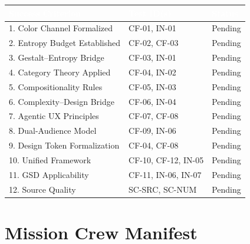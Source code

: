 \documentclass[11pt,letterpaper]{article}
\newcommand{\tableheader}[1]{\textbf{\sffamily\textcolor{white}{#1}}}
\begin{document}
\begin{center}
\begin{tabularx}{\textwidth}{XL{3.5cm}C{1.5cm}}
\toprule
{}
\tableheader{Success Criterion} & \tableheader{Test ID(s)} & \tableheader{Status} \\
. Color Channel Formalized & CF-01, IN-01 & Pending \\
2. Entropy Budget Established & CF-02, CF-03 & Pending \\
3. Gestalt--Entropy Bridge & CF-03, IN-01 & Pending \\
4. Category Theory Applied & CF-04, IN-02 & Pending \\
5. Compositionality Rules & CF-05, IN-03 & Pending \\
6. Complexity--Design Bridge & CF-06, IN-04 & Pending \\
7. Agentic UX Principles & CF-07, CF-08 & Pending \\
8. Dual-Audience Model & CF-09, IN-06 & Pending \\
9. Design Token Formalization & CF-04, CF-08 & Pending \\
10. Unified Framework & CF-10, CF-12, IN-05 & Pending \\
11. GSD Applicability & CF-11, IN-06, IN-07 & Pending \\
12. Source Quality & SC-SRC, SC-NUM & Pending \\
\bottomrule
\end{tabularx}
\end{center}

\section{Mission Crew Manifest}
\end{document}
